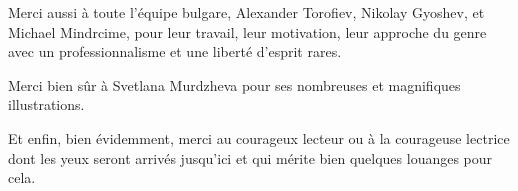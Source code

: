 \documentclass{report}
\begin{document}
Merci aussi à toute l'équipe bulgare, Alexander Torofiev, Nikolay Gyoshev, et Michael Mindrcime, pour leur travail, leur motivation, leur approche du genre avec un professionnalisme et une liberté d'esprit rares.

Merci bien sûr à Svetlana Murdzheva pour ses nombreuses et magnifiques illustrations.

Et enfin, bien évidemment, merci au courageux lecteur ou à la courageuse lectrice dont les yeux seront arrivés jusqu'ici et qui mérite bien quelques louanges pour cela.
\end{document}
